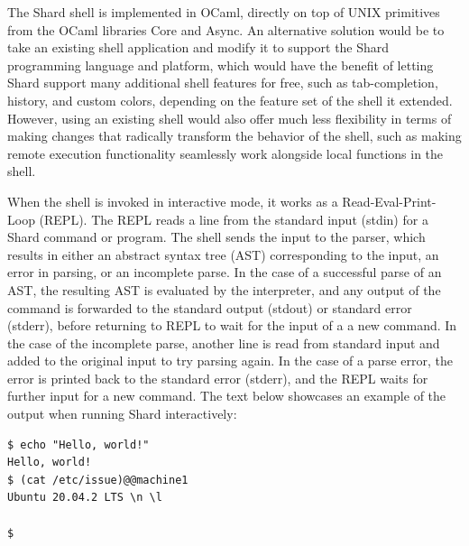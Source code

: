 \documentclass[twoside]{report}
\begin{document}

The Shard shell is implemented in OCaml, directly on top of UNIX primitives from the OCaml libraries Core and Async.
An alternative solution would be to take an existing shell application and modify it to support the Shard programming language and platform, which would have the benefit of letting Shard support many additional shell features for free, such as tab-completion, history, and custom colors, depending on the feature set of the shell it extended.
However, using an existing shell would also offer much less flexibility in terms of making changes that radically transform the behavior of the shell, such as making remote execution functionality seamlessly work alongside local functions in the shell.

When the shell is invoked in interactive mode, it works as a Read-Eval-Print-Loop (REPL). The REPL reads a line from the standard input (stdin) for a Shard command or program. The shell sends the input to the parser, which results in either an abstract syntax tree (AST) corresponding to the input, an error in parsing, or an incomplete parse.
In the case of a successful parse of an AST, the resulting AST is evaluated by the interpreter, and any output of the command is forwarded to the standard output (stdout) or standard error (stderr), before returning to REPL to wait for the input of a a new command.
In the case of the incomplete parse, another line is read from standard input and added to the original input to try parsing again.
In the case of a parse error, the error is printed back to the standard error (stderr), and the REPL waits for further input for a new command.
The text below showcases an example of the output when running Shard interactively:

\begin{minipage}[c]{\textwidth-15pt}
  \begin{lstlisting}[language=Shard]
$ echo "Hello, world!"
Hello, world!
$ (cat /etc/issue)@@machine1
Ubuntu 20.04.2 LTS \n \l

$
\end{lstlisting}
  \smallskip
\end{minipage}
\end{document}
